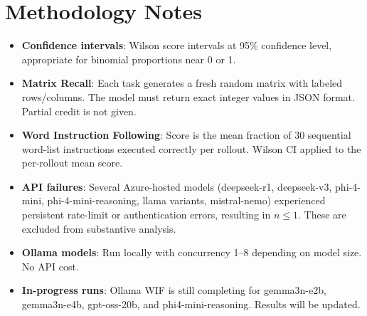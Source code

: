 \documentclass[11pt,letterpaper]{article}
\begin{document}
\section*{Methodology Notes}

\begin{itemize}
\item \textbf{Confidence intervals}: Wilson score intervals at 95\% confidence level, appropriate for binomial proportions near 0 or 1.
\item \textbf{Matrix Recall}: Each task generates a fresh random matrix with labeled rows/columns. The model must return exact integer values in JSON format. Partial credit is not given.
\item \textbf{Word Instruction Following}: Score is the mean fraction of 30 sequential word-list instructions executed correctly per rollout. Wilson CI applied to the per-rollout mean score.
\item \textbf{API failures}: Several Azure-hosted models (deepseek-r1, deepseek-v3, phi-4-mini, phi-4-mini-reasoning, llama variants, mistral-nemo) experienced persistent rate-limit or authentication errors, resulting in $n \leq 1$. These are excluded from substantive analysis.
\item \textbf{Ollama models}: Run locally with concurrency 1--8 depending on model size. No API cost.
\item \textbf{In-progress runs}: Ollama WIF is still completing for gemma3n-e2b, gemma3n-e4b, gpt-oss-20b, and phi4-mini-reasoning. Results will be updated.
\end{itemize}
\end{document}
